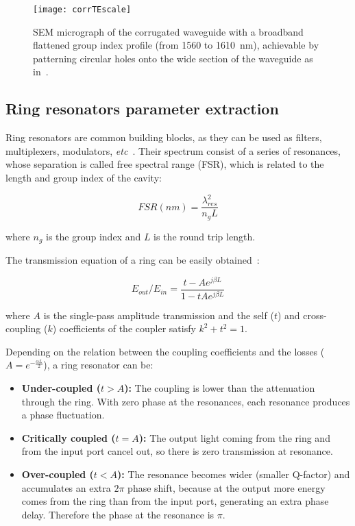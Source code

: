 \begin{figure}[htb]
	\centering
	\texttt{[image: corrTEscale]}	
	\caption{SEM micrograph of the corrugated waveguide with a broadband flattened group index profile (from 1560 to 1610~nm), achievable by patterning circular holes onto the wide section of the waveguide as in~\cite{Brimont2010}.}
	\label{fig:sem}
 \end{figure} 


 
\subsection{Ring resonators parameter extraction}
\label{sec:ringResonators}
Ring resonators are common building blocks, as they can be used as filters, multiplexers, modulators, \emph{etc}~\cite{Bogaerts:12}.
Their spectrum consist of a series of resonances, whose separation is called free spectral range (FSR), which is related to the length and group index of the cavity:

\begin{equation}
	FSR (nm)=\frac{\lambda_{res}^2}{n_gL}
	\label{eq:FSRanillo}
\end{equation} 

where $n_g$ is the group index and $L$ is the round trip length.

The transmission equation of a ring can be easily obtained~\cite{McKinnon2009}:

\begin{equation}
	E_{out}/E_{in}=\frac{t-Ae^{j\beta L}}{1-tAe^{j\beta L}}
\label{eq:transmissionRing}
\end{equation}


where $A$ is the single-pass amplitude transmission and the self ($t$) and cross-coupling ($k$) coefficients of the coupler satisfy $k^2+t^2=1$.

Depending on the relation between the coupling coefficients and the losses ($A=e^{-\frac{\alpha L}{2}}$), a ring resonator can be:

\begin{itemize}
 \item \textbf{Under-coupled ($t>A$):} The coupling is lower than the attenuation through the ring.
 With zero phase at the resonances, each resonance produces a phase fluctuation. 

 \item \textbf{Critically coupled ($t=A$):} The output light coming from the ring and from the input port cancel out, so there is zero transmission at resonance.

 
 \item \textbf{Over-coupled ($t<A$):} The resonance becomes wider (smaller Q-factor) and accumulates an extra $2\pi$ phase shift, because at the output more energy comes from the ring than from the input port, generating an extra phase delay.
 Therefore the phase at the resonance is $\pi$.
\end{itemize}


